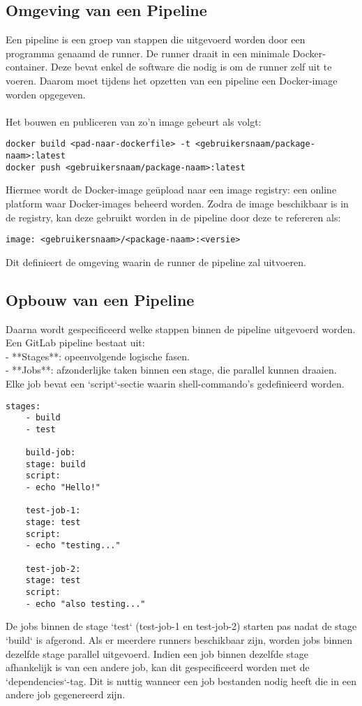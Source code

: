 \documentclass{article}
\begin{document}
\subsection{Omgeving van een Pipeline}

Een pipeline is een groep van stappen die uitgevoerd worden door een programma genaamd de runner. De runner draait in een minimale Docker-container. Deze bevat enkel de software die nodig is om de runner zelf uit te voeren. Daarom moet tijdens het opzetten van een pipeline een Docker-image worden opgegeven.  
\\
\\
Het bouwen en publiceren van zo’n image gebeurt als volgt:
\begin{lstlisting}[style=console]
docker build <pad-naar-dockerfile> -t <gebruikersnaam/package-naam>:latest 
docker push <gebruikersnaam/package-naam>:latest
\end{lstlisting}
Hiermee wordt de Docker-image geüpload naar een image registry: een online platform waar Docker-images beheerd worden. Zodra de image beschikbaar is in de registry, kan deze gebruikt worden in de pipeline door deze te refereren als:
\begin{lstlisting}[style=console]
    image: <gebruikersnaam>/<package-naam>:<versie>
\end{lstlisting}
Dit definieert de omgeving waarin de runner de pipeline zal uitvoeren.

\newpage
\subsection{Opbouw van een Pipeline}

Daarna wordt gespecificeerd welke stappen binnen de pipeline uitgevoerd worden. Een GitLab pipeline bestaat uit:
\\
- **Stages**: opeenvolgende logische fasen.
\\
- **Jobs**: afzonderlijke taken binnen een stage, die parallel kunnen draaien.
\\
Elke job bevat een `script`-sectie waarin shell-commando’s gedefinieerd worden.

\begin{lstlisting}[style=yaml]
    stages:
    - build
    - test
    
    build-job:
    stage: build
    script:
    - echo "Hello!"
    
    test-job-1:
    stage: test
    script:
    - echo "testing..."
    
    test-job-2:
    stage: test
    script:
    - echo "also testing..."
\end{lstlisting}
De jobs binnen de stage `test` (test-job-1 en test-job-2) starten pas nadat de stage `build` is afgerond. Als er meerdere runners beschikbaar zijn, worden jobs binnen dezelfde stage parallel uitgevoerd.  
Indien een job binnen dezelfde stage afhankelijk is van een andere job, kan dit gespecificeerd worden met de `dependencies`-tag. Dit is nuttig wanneer een job bestanden nodig heeft die in een andere job gegenereerd zijn.
\end{document}
